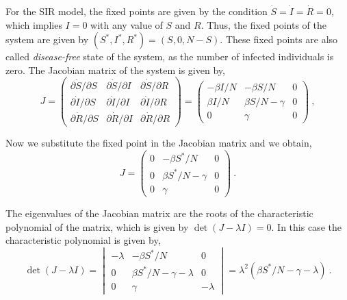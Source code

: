 For the SIR model, the fixed points are given by the condition
$\dot{S}=\dot{I}=\dot{R}=0$, which implies $I=0$ with any value of $S$ and $R$.
Thus, the fixed points of the system are given by $(S^*,I^*,R^*)=(S,0,N-S)$.
These fixed points are also called \textit{disease-free} state of the system,
as the number of infected individuals is zero. The Jacobian matrix of the
system is given by,
\begin{equation}
  J=\begin{pmatrix}
    \partial\dot{S}/\partial S & \partial\dot{S}/\partial I &
    \partial\dot{S}/\partial R                                \\
    \partial\dot{I}/\partial S & \partial\dot{I}/\partial I &
    \partial\dot{I}/\partial R                                \\
    \partial\dot{R}/\partial S & \partial\dot{R}/\partial I &
    \partial\dot{R}/\partial R
  \end{pmatrix}=\begin{pmatrix}
    -\beta I/N & -\beta S/N       & 0 \\
    \beta I/N  & \beta S/N-\gamma & 0 \\
    0          & \gamma           & 0
  \end{pmatrix} \ ,
\end{equation}

Now we substitute the fixed point in the Jacobian matrix and we obtain,
\begin{equation}
  J=\begin{pmatrix}
    0 & -\beta S^*/N       & 0 \\
    0 & \beta S^*/N-\gamma & 0 \\
    0 & \gamma             & 0
  \end{pmatrix} \ .
\end{equation}

The eigenvalues of the Jacobian matrix are the roots of the characteristic
polynomial of the matrix, which is given by $\det(J-\lambda I)=0$. In this case
the characteristic polynomial is given by,
\begin{equation}
  \det(J-\lambda I)=\begin{vmatrix}
    -\lambda & -\beta S^*/N                & 0        \\
    0        & \beta S^*/N-\gamma -\lambda & 0        \\
    0        & \gamma                      & -\lambda
  \end{vmatrix}=\lambda^2(\beta S^*/N-\gamma-\lambda) \ .
\end{equation}

